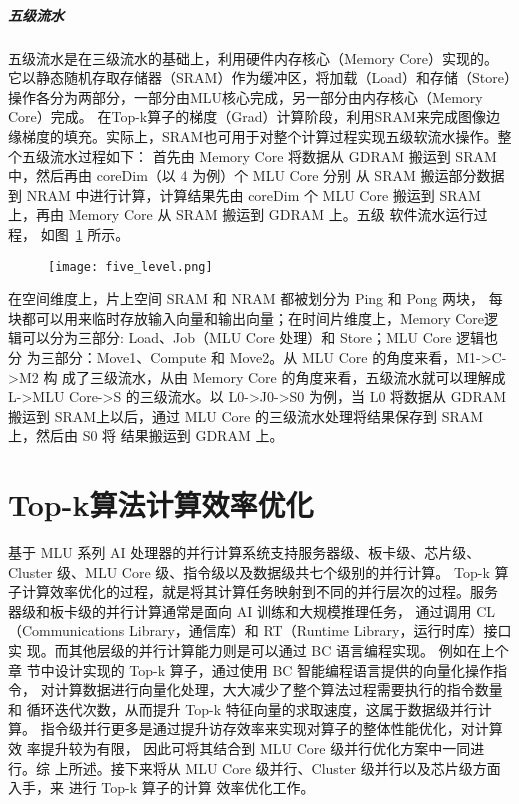 \subparagraph{五级流水}

五级流水是在三级流水的基础上，利用硬件内存核心（Memory Core）实现的。它以静态随机存取存储器（SRAM）作为缓冲区，将加载（Load）和存储（Store）操作各分为两部分，一部分由MLU核心完成，另一部分由内存核心（Memory Core）完成。
在Top-k算子的梯度（Grad）计算阶段，利用SRAM来完成图像边缘梯度的填充。实际上，SRAM也可用于对整个计算过程实现五级软流水操作。整个五级流水过程如下：
首先由 Memory Core 将数据从 GDRAM 搬运到 SRAM 中，然后再由 coreDim（以 4 为例）个 MLU Core 分别 从 SRAM 搬运部分数据到 NRAM 中进行计算，计算结果先由 coreDim 个 MLU Core 搬运到 SRAM 上，再由 Memory Core 从 SRAM 搬运到 GDRAM 上。五级 软件流水运行过程，
如图~\ref{fig:five_level} 所示。
\begin{figure}[ht]
    \centering
    \texttt{[image: five\_level.png]}
    \caption{}
    \label{fig:five_level}
\end{figure}
在空间维度上，片上空间 SRAM 和 NRAM 都被划分为 Ping 和 Pong 两块， 每块都可以用来临时存放输入向量和输出向量；在时间片维度上，Memory Core逻辑可以分为三部分: Load、Job（MLU Core 处理）和 Store；MLU Core 逻辑也分 为三部分：Move1、Compute 和 Move2。从 MLU Core 的角度来看，M1->C->M2 构 成了三级流水，从由 Memory Core 的角度来看，五级流水就可以理解成 L->MLU Core->S 的三级流水。以 L0->J0->S0 为例，当 L0 将数据从 GDRAM 搬运到 SRAM上以后，通过 MLU Core 的三级流水处理将结果保存到 SRAM 上，然后由 S0 将 结果搬运到 GDRAM 上。






\section{Top-k算法计算效率优化}
基于 MLU 系列 AI 处理器的并行计算系统支持服务器级、板卡级、芯片级、Cluster 级、MLU Core 级、指令级以及数据级共七个级别的并行计算。
Top-k 算 子计算效率优化的过程，就是将其计算任务映射到不同的并行层次的过程。服务 器级和板卡级的并行计算通常是面向 AI 训练和大规模推理任务，
通过调用 CL（Communications Library，通信库）和 RT（Runtime Library，运行时库）接口实 现。而其他层级的并行计算能力则是可以通过 BC 语言编程实现。
例如在上个章 节中设计实现的 Top-k 算子，通过使用 BC 智能编程语言提供的向量化操作指令， 对计算数据进行向量化处理，大大减少了整个算法过程需要执行的指令数量和
 循环迭代次数，从而提升 Top-k 特征向量的求取速度，这属于数据级并行计算。 指令级并行更多是通过提升访存效率来实现对算子的整体性能优化，对计算效 率提升较为有限，
 因此可将其结合到 MLU Core 级并行优化方案中一同进行。综 上所述。接下来将从 MLU Core 级并行、Cluster 级并行以及芯片级方面入手，来 进行 Top-k 算子的计算
 效率优化工作。

